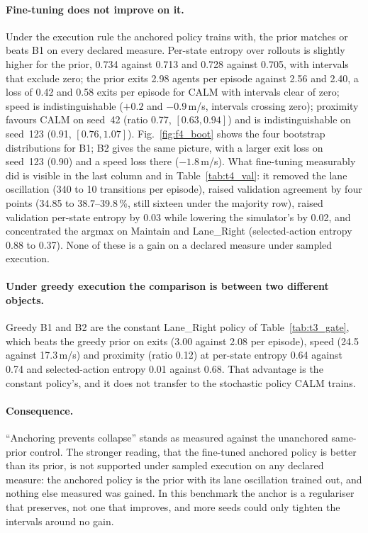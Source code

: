 \paragraph{Fine-tuning does not improve on it.}
Under the execution rule the anchored policy trains with, the prior matches or beats B1 on every declared measure. Per-state entropy over rollouts is slightly higher for the prior, 0.734 against 0.713 and 0.728 against 0.705, with intervals that exclude zero; the prior exits 2.98 agents per episode against 2.56 and 2.40, a loss of 0.42 and 0.58 exits per episode for CALM with intervals clear of zero; speed is indistinguishable ($+0.2$ and $-0.9$\,m/s, intervals crossing zero); proximity favours CALM on seed~42 (ratio 0.77, $[0.63,0.94]$) and is indistinguishable on seed~123 (0.91, $[0.76,1.07]$). Fig.~\ref{fig:f4_boot} shows the four bootstrap distributions for B1; B2 gives the same picture, with a larger exit loss on seed~123 (0.90) and a speed loss there ($-1.8$\,m/s). What fine-tuning measurably did is visible in the last column and in Table~\ref{tab:t4_val}: it removed the lane oscillation (340 to 10 transitions per episode), raised validation agreement by four points (34.85 to 38.7--39.8\,\%, still sixteen under the majority row), raised validation per-state entropy by 0.03 while lowering the simulator's by 0.02, and concentrated the argmax on Maintain and Lane\_Right (selected-action entropy 0.88 to 0.37). None of these is a gain on a declared measure under sampled execution.

\paragraph{Under greedy execution the comparison is between two different objects.}
Greedy B1 and B2 are the constant Lane\_Right policy of Table~\ref{tab:t3_gate}, which beats the greedy prior on exits (3.00 against 2.08 per episode), speed (24.5 against 17.3\,m/s) and proximity (ratio 0.12) at per-state entropy 0.64 against 0.74 and selected-action entropy 0.01 against 0.68. That advantage is the constant policy's, and it does not transfer to the stochastic policy CALM trains.

\paragraph{Consequence.}
``Anchoring prevents collapse'' stands as measured against the unanchored same-prior control. The stronger reading, that the fine-tuned anchored policy is better than its prior, is not supported under sampled execution on any declared measure: the anchored policy is the prior with its lane oscillation trained out, and nothing else measured was gained. In this benchmark the anchor is a regulariser that preserves, not one that improves, and more seeds could only tighten the intervals around no gain.

